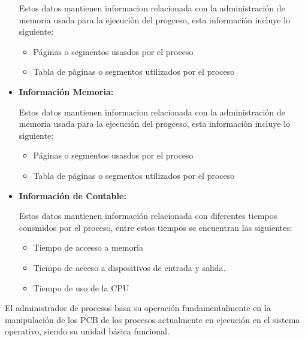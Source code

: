 \documentclass[12pt, fleqn]{report}                             %
\begin{document}
\begin{itemize}
                        Estos datos mantienen informacion relacionada con la administración de memoria
                        usada para la ejecuciòn del progceso, esta información incluye lo siguiente:

                        \begin{itemize}
                            \item Páginas o segmentos usasdos por el proceso
                            \item Tabla de pàginas o segmentos utilizados por el proceso 
                        \end{itemize}
                
                \item
                    \textbf{Información Memoria:}

                        Estos datos mantienen informacion relacionada con la administración de memoria
                        usada para la ejecución del progceso, esta informaciòn incluye lo siguiente: 
                            \begin{itemize}
                                \item Páginas o segmentos usasdos por el proceso
                                \item Tabla de páginas o segmentos utilizados por el proceso 
                            \end{itemize}
                
                \item
                    \textbf{Información de Contable:}
                    
                        Estos datos mantienen información relacionada con diferentes tiempos consmidos por
                        el proceso, entre estos tiempos se encuentran las siguientes: 
                        \begin{itemize}
                            \item Tiempo de accesso a memoria 
                            \item Tiempo de acceso a dispositivos de entrada y salida.
                            \item Tiempo de uso de la CPU
                        \end{itemize}

                \end{itemize}

                El administrador de procesos basa su operación fundamentalmente en la manipulación de los PCB
                de los procesos actualmente en ejecución en el sistema operativo, siendo su unidad básica funcional.
        
\end{document}

